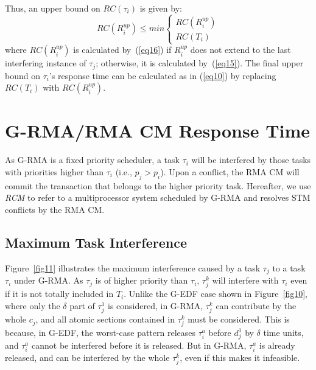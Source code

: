 \documentclass[letter]{sig-alternate}
\begin{document}
Thus, an upper bound on $RC(\tau_i)$ is given by:
\begin{equation}
RC(R_{i}^{up})\le min\begin{cases}
RC(R_{i}^{up})\\
RC(T_{i})\end{cases}
\label{eq17}
\end{equation}
where $RC(R_i^{up})$ is calculated by~(\ref{eq16}) if $R_i^{up}$ does not extend to the last interfering instance of $\tau_j$; otherwise, it is calculated by~(\ref{eq15}). The final upper bound on $\tau_{i}$'s response time can be calculated
as in (\ref{eq10}) by replacing $RC(T_{i})$ with
$RC(R_{i}^{up})$.



\section{G-RMA/RMA CM Response Time}
\label{sec:g-rma-rma-cm}

As G-RMA is a fixed priority scheduler,  a task $\tau_{i}$ will be interfered by those tasks with priorities higher than $\tau_{i}$ (i.e., $p_{j}>p_{i}$).  Upon a conflict, the RMA CM will commit the transaction that belongs to the higher priority task. Hereafter, we use \emph{RCM} to refer to a multiprocessor system scheduled by G-RMA and resolves STM conflicts by the RMA CM.


\subsection{Maximum Task Interference}


Figure~\ref{fig11} illustrates the maximum interference caused by a task $\tau_{j}$
to a task $\tau_{i}$ under G-RMA. As $\tau_{j}$ is of higher priority than $\tau_{i}$,
$\tau_{j}^{k}$ will interfere with $\tau_{i}$ even if it is not totally
included in $T_{i}$. Unlike the G-EDF case shown in Figure~\ref{fig10}, 
where only the $\delta$ part of $\tau_{j}^{1}$ is considered, in G-RMA,
$\tau_{j}^{k}$ can contribute by the whole $c_{j}$, and all atomic
sections contained in $\tau_{j}^{k}$ must be considered. This is because, in G-EDF, the worst-case pattern releases $\tau_{i}^a$ before $d_{j}^{1}$
by $\delta$ time units, and $\tau_{i}^a$ cannot be interfered before it
is released. But in G-RMA, $\tau_{i}^a$ is already released, and can be
interfered by the whole $\tau_{j}^{k}$, even if this makes it infeasible.
\end{document}
